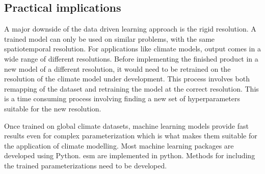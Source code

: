 \subsection{Practical implications} \label{sec:practical_implications}
A major downside of the data driven learning approach is the rigid resolution. A trained model can only be used on similar problems, with the same spatiotemporal resolution. For applications like climate models, output comes in a wide range of different resolutions. Before implementing the finished product in a new model of a different resolution, it would need to be retrained on the resolution of the climate model under development. This process involves both remapping of the dataset and retraining the model at the correct resolution. This is a time consuming process involving finding a new set of hyperparameters suitable for the new resolution. %

Once trained on global climate datasets, machine learning models provide fast results even for complex parameterization which is what makes them suitable for the application of climate modelling. Most machine learning packages are developed using Python. \acrfull{esm} are implemented in python. Methods for including the trained parameterizations need to be developed.

